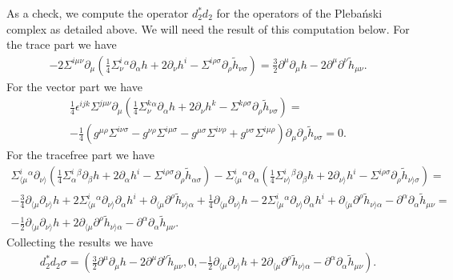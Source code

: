 \documentclass[10pt]{report}
\newcommand{\pleb}[0]{Pleba\'nski}
\theoremstyle{definition}
\begin{document}
As a check, we compute the operator $d_2^* d_2$ for the operators of the \pleb{} complex as detailed above. We will need the result of this computation below. For the trace part we have
\begin{align}
-2 \Sigma^{i\mu\nu} \partial_\mu (\frac{1}{4} \Sigma^i_\nu{}^\alpha \partial_\alpha h +2 \partial_\nu h^i -  \Sigma^{i\rho\sigma} \partial_\rho \tilde{h}_{\nu\sigma} )=
\frac{3}{2} \partial^\mu \partial_\mu h - 2 \partial^\mu \partial^\nu \tilde{h}_{\mu\nu}.
\end{align}
For the vector part we have
\begin{align}
\frac{1}{4} \epsilon^{ijk} \Sigma^{j\mu\nu} \partial_\mu (\frac{1}{4} \Sigma^k_\nu{}^\alpha \partial_\alpha h +2 \partial_\nu h^k -  \Sigma^{k\rho\sigma} \partial_\rho \tilde{h}_{\nu\sigma} )=
\\ \nonumber
- \frac{1}{4}( g^{\mu\rho} \Sigma^{i\nu\sigma} - g^{\nu\rho} \Sigma^{i\mu\sigma} - g^{\mu\sigma} \Sigma^{i\nu\rho} + g^{\nu\sigma} \Sigma^{i\mu\rho}) \partial_\mu\partial_\rho \tilde{h}_{\nu\sigma} =0.
\end{align}
For the tracefree part we have
\begin{align}\nonumber
\Sigma^i_{\langle\mu}{}^\alpha \partial_{\nu\rangle}(\frac{1}{4} \Sigma^i_\alpha{}^\beta \partial_\beta h +2 \partial_\alpha h^i -  \Sigma^{i\rho\sigma} \partial_\rho \tilde{h}_{\alpha\sigma} )
-\Sigma^i_{\langle\mu}{}^\alpha \partial_\alpha (\frac{1}{4} \Sigma^i_{\nu\rangle}{}^\beta \partial_\beta h +2 \partial_{\nu\rangle} h^i -  \Sigma^{i\rho\sigma} \partial_\rho \tilde{h}_{\nu\rangle\sigma} )= \\ \nonumber
- \frac{3}{4} \partial_{\langle\mu} \partial_{\nu\rangle} h + 2 \Sigma^i_{\langle\mu}{}^\alpha \partial_{\nu\rangle}\partial_\alpha h^i + \partial_{\langle\mu}\partial^\rho \tilde{h}_{\nu\rangle \alpha}
+ \frac{1}{4} \partial_{\langle\mu} \partial_{\nu\rangle} h - 2 \Sigma^i_{\langle\mu}{}^\alpha \partial_{\nu\rangle}\partial_\alpha h^i + \partial_{\langle\mu}\partial^\rho \tilde{h}_{\nu\rangle \alpha}- \partial^\alpha \partial_\alpha \tilde{h}_{\mu\nu}= \\ \nonumber
-  \frac{1}{2} \partial_{\langle\mu} \partial_{\nu\rangle} h+ 2\partial_{\langle\mu}\partial^\rho \tilde{h}_{\nu\rangle \alpha}- \partial^\alpha \partial_\alpha \tilde{h}_{\mu\nu}.
\end{align}
Collecting the results we have
\begin{align}\label{d2}
d_2^* d_2 \sigma = ( \frac{3}{2} \partial^\mu \partial_\mu h - 2 \partial^\mu \partial^\nu \tilde{h}_{\mu\nu}, 0, -  \frac{1}{2} \partial_{\langle\mu} \partial_{\nu\rangle} h+ 2\partial_{\langle\mu}\partial^\rho \tilde{h}_{\nu\rangle \alpha}- \partial^\alpha \partial_\alpha \tilde{h}_{\mu\nu}).
\end{align}
\end{document}
